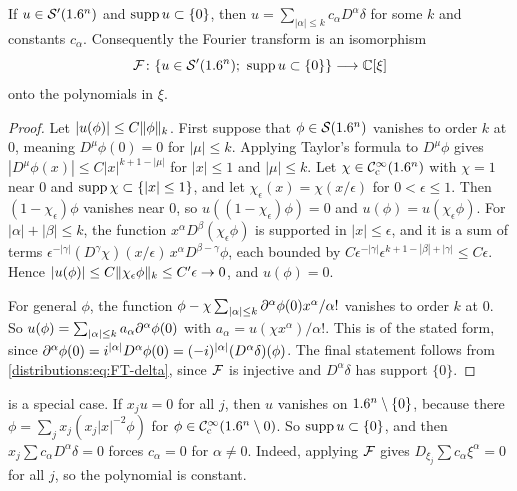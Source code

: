 \begin{theorem}\label{distributions:thm:point-support}
If $u\in\mathcal{S}'(1.6^n)$ and $\operatorname{supp} u\subset\{0\}$, then $u=\sum_{|\alpha|\le k}c_\alpha D^\alpha\delta$
for some $k$ and constants $c_\alpha$. Consequently the Fourier transform is an
isomorphism
\[
  \mathcal{F}\colon\{u\in\mathcal{S}'(1.6^n);\ \operatorname{supp} u\subset\{0\}\}\longrightarrow\mathbb{C}[\xi]
\]
onto the polynomials in $\xi$.
\end{theorem}
\begin{proof}
Let $|u(\phi)|\le C\lVert \phi\rVert_k$. First suppose that $\phi\in\mathcal{S}(1.6^n)$ vanishes to
order $k$ at $0$, meaning $D^\mu\phi(0)=0$ for $|\mu|\le k$. Applying Taylor's formula
to $D^\mu\phi$ gives $|D^\mu\phi(x)|\le C|x|^{k+1-|\mu|}$ for $|x|\le1$ and
$|\mu|\le k$. Let $\chi\in\mathcal{C}^\infty_{\mathrm{c}}(1.6^n)$ with $\chi=1$ near $0$ and $\operatorname{supp}\chi\subset\{|x|\le1\}$,
and let $\chi_\epsilon(x)=\chi(x/\epsilon)$ for $0<\epsilon\le1$. Then $(1-\chi_\epsilon)\phi$
vanishes near $0$, so $u((1-\chi_\epsilon)\phi)=0$ and $u(\phi)=u(\chi_\epsilon\phi)$. For
$|\alpha|+|\beta|\le k$, the function $x^\alpha D^\beta(\chi_\epsilon\phi)$ is supported in
$|x|\le\epsilon$, and it is a sum of terms
$\epsilon^{-|\gamma|}(D^\gamma\chi)(x/\epsilon)\,x^\alpha D^{\beta-\gamma}\phi$, each
bounded by $C\epsilon^{-|\gamma|}\epsilon^{k+1-|\beta|+|\gamma|}\le C\epsilon$. Hence
$|u(\phi)|\le C\lVert \chi_\epsilon\phi\rVert_k\le C'\epsilon\to0$, and $u(\phi)=0$.

For general $\phi$, the function
$\phi-\chi\sum_{|\alpha|\le k}\partial^\alpha\phi(0)x^\alpha/\alpha!$ vanishes to order $k$ at $0$.
So $u(\phi)=\sum_{|\alpha|\le k}a_\alpha\partial^\alpha\phi(0)$ with
$a_\alpha=u(\chi x^\alpha)/\alpha!$. This is of the stated form, since
$\partial^\alpha\phi(0)=i^{|\alpha|}D^\alpha\phi(0)=(-i)^{|\alpha|}(D^\alpha\delta)(\phi)$.
The final statement follows from \eqref{distributions:eq:FT-delta}, since $\mathcal{F}$ is
injective and $D^\alpha\delta$ has support $\{0\}$.
\end{proof}

 is a special case. If $x_ju=0$ for all $j$, then $u$
vanishes on $1.6^n\setminus\{0\}$, because there $\phi=\sum_jx_j(x_j|x|^{-2}\phi)$ for
$\phi\in\mathcal{C}^\infty_{\mathrm{c}}(1.6^n\setminus0)$. So $\operatorname{supp} u\subset\{0\}$, and then
$x_j\sum c_\alpha D^\alpha\delta=0$ forces $c_\alpha=0$ for $\alpha\ne0$. Indeed, applying
$\mathcal{F}$ gives $D_{\xi_j}\sum c_\alpha\xi^\alpha=0$ for all $j$, so the polynomial is constant.


